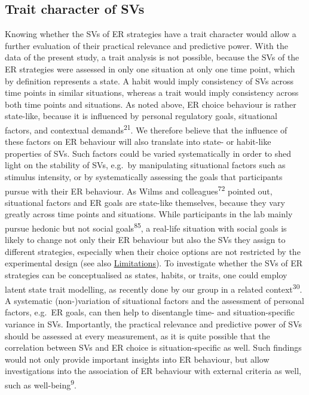 \documentclass[
  man,floatsintext]{apa6}
\begin{document}
\hypertarget{trait-character-of-svs}{%
\subsection{Trait character of SVs}\label{trait-character-of-svs}}

Knowing whether the SVs of ER strategies have a trait character would allow a further evaluation of their practical relevance and predictive power.
With the data of the present study, a trait analysis is not possible, because the SVs of the ER strategies were assessed in only one situation at only one time point, which by definition represents a state.
A habit would imply consistency of SVs across time points in similar situations, whereas a trait would imply consistency across both time points and situations.
As noted above, ER choice behaviour is rather state-like, because it is influenced by personal regulatory goals, situational factors, and contextual demands\textsuperscript{21}.
We therefore believe that the influence of these factors on ER behaviour will also translate into state- or habit-like properties of SVs.
Such factors could be varied systematically in order to shed light on the stability of SVs, e.g.~by manipulating situational factors such as stimulus intensity, or by systematically assessing the goals that participants pursue with their ER behaviour.
As Wilms and colleagues\textsuperscript{72} pointed out, situational factors and ER goals are state-like themselves, because they vary greatly across time points and situations.
While participants in the lab mainly pursue hedonic but not social goals\textsuperscript{85}, a real-life situation with social goals is likely to change not only their ER behaviour but also the SVs they assign to different strategies, especially when their choice options are not restricted by the experimental design (see also \protect\hyperlink{Limitations}{Limitations}).
To investigate whether the SVs of ER strategies can be conceptualised as states, habits, or traits, one could employ latent state trait modelling, as recently done by our group in a related context\textsuperscript{30}.
A systematic (non-)variation of situational factors and the assessment of personal factors, e.g.~ER goals, can then help to disentangle time- and situation-specific variance in SVs.
Importantly, the practical relevance and predictive power of SVs should be assessed at every measurement, as it is quite possible that the correlation between SVs and ER choice is situation-specific as well.
Such findings would not only provide important insights into ER behaviour, but allow investigations into the association of ER behaviour with external criteria as well, such as well-being\textsuperscript{9}.
\end{document}
